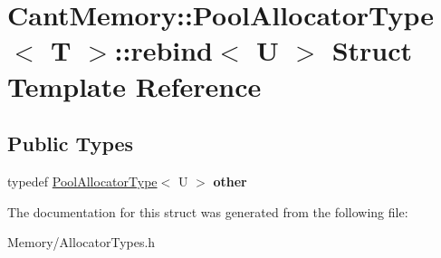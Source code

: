 \hypertarget{structCantMemory_1_1PoolAllocatorType_1_1rebind}{}\section{Cant\+Memory\+:\+:Pool\+Allocator\+Type$<$ T $>$\+:\+:rebind$<$ U $>$ Struct Template Reference}
\label{structCantMemory_1_1PoolAllocatorType_1_1rebind}
\subsection*{Public Types}
\begin{DoxyCompactItemize}
\item 
\mbox{\label{structCantMemory_1_1PoolAllocatorType_1_1rebind_aaefb78585ff4672ba21c995bf8c7d65d}} 
typedef \hyperlink{classCantMemory_1_1PoolAllocatorType}{Pool\+Allocator\+Type}$<$ U $>$ {\bfseries other}
\end{DoxyCompactItemize}


The documentation for this struct was generated from the following file\+:\begin{DoxyCompactItemize}
\item 
Memory/Allocator\+Types.\+h\end{DoxyCompactItemize}
